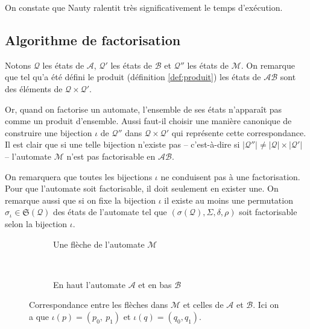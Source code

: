 \documentclass[11pt,a4paper]{article}
\begin{document}
On constate que Nauty ralentit très significativement le temps d'exécution.

\subsection{Algorithme de factorisation\label{sec:facto}}

  Notons $\mathcal{Q}$ les états de $\mathcal{A}$, $\mathcal{Q'}$ les états de $\mathcal{B}$ et $\mathcal{Q''}$ les états de $\mathcal{M}$. On remarque que tel qu'a été défini le produit (définition \ref{def:produit}) les états de $\mathcal{AB}$ sont des éléments de $\mathcal{Q}\times\mathcal{Q'}$.

Or, quand on factorise un automate, l'ensemble de ses états n'apparaît pas comme un produit d'ensemble. Aussi faut-il choisir une manière canonique de construire une bijection $\iota$ de $\mathcal{Q''}$ dans $\mathcal{Q}\times\mathcal{Q'}$ qui représente cette correspondance. Il est clair que si une telle bijection n'existe pas -- c'est-à-dire si $|\mathcal{Q}''| \ne |\mathcal{Q}|\times|\mathcal{Q'}|$ -- l'automate $\mathcal{M}$ n'est pas factorisable en $\mathcal{AB}$.


On remarquera que toutes les bijections $\iota$ ne conduisent pas à une factorisation. Pour que l'automate soit factorisable, il doit seulement en exister une. On remarque aussi que si on fixe la bijection $\iota$ il existe au moins une permutation $\sigma_\iota\in\mathfrak{S}(\mathcal{Q})$ des états de l'automate tel que $\left(\sigma(\mathcal{Q}), \Sigma, \delta, \rho\right)$ soit factorisable selon la bijection $\iota$.

\begin{figure}[h!]
  \begin{subfigure}[b]{0.5\textwidth}
    \centering
    \caption{Une flèche de l'automate $\mathcal{M}$}
  \end{subfigure}
  ~
  \begin{subfigure}[b]{0.5\textwidth}
    \centering
    \caption{En haut l'automate $\mathcal{A}$ et en bas $\mathcal{B}$\label{fig:factor-ab}}
  \end{subfigure}
  \caption{Correspondance entre les flèches dans $\mathcal{M}$ et celles de $\mathcal{A}$ et $\mathcal{B}$. Ici on a que $\iota(p) = (p_0,~p_1)$ et $\iota(q)=(q_0, q_1)$\label{fig:facto}.}
\end{figure}
\end{document}
